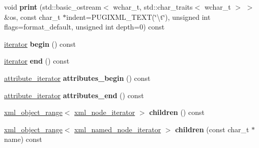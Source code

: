\begin{DoxyCompactItemize}
\item 
\hypertarget{classpugi_1_1xml__node_a59a563de9fb47e3916f35f14a77d19a9}{}void {\bfseries print} (std\+::basic\+\_\+ostream$<$ wchar\+\_\+t, std\+::char\+\_\+traits$<$ wchar\+\_\+t $>$ $>$ \&os, const char\+\_\+t $\ast$indent=P\+U\+G\+I\+X\+M\+L\+\_\+\+T\+E\+X\+T(\char`\"{}\textbackslash{}t\char`\"{}), unsigned int flags=format\+\_\+default, unsigned int depth=0) const \label{classpugi_1_1xml__node_a59a563de9fb47e3916f35f14a77d19a9}

\item 
\hypertarget{classpugi_1_1xml__node_af1cfcc7ccae47095cd781a3c9c9b06e4}{}\hyperlink{classpugi_1_1xml__node__iterator}{iterator} {\bfseries begin} () const \label{classpugi_1_1xml__node_af1cfcc7ccae47095cd781a3c9c9b06e4}

\item 
\hypertarget{classpugi_1_1xml__node_a6e5b29519d6a1f08aa936d96624e095a}{}\hyperlink{classpugi_1_1xml__node__iterator}{iterator} {\bfseries end} () const \label{classpugi_1_1xml__node_a6e5b29519d6a1f08aa936d96624e095a}

\item 
\hypertarget{classpugi_1_1xml__node_a1b4ab605d879cf5623e20505500b836e}{}\hyperlink{classpugi_1_1xml__attribute__iterator}{attribute\+\_\+iterator} {\bfseries attributes\+\_\+begin} () const \label{classpugi_1_1xml__node_a1b4ab605d879cf5623e20505500b836e}

\item 
\hypertarget{classpugi_1_1xml__node_a528b9274b0adeeda5ed12567057bee17}{}\hyperlink{classpugi_1_1xml__attribute__iterator}{attribute\+\_\+iterator} {\bfseries attributes\+\_\+end} () const \label{classpugi_1_1xml__node_a528b9274b0adeeda5ed12567057bee17}

\item 
\hypertarget{classpugi_1_1xml__node_a267ab4724e63940e5a50234fc52bc855}{}\hyperlink{classpugi_1_1xml__object__range}{xml\+\_\+object\+\_\+range}$<$ \hyperlink{classpugi_1_1xml__node__iterator}{xml\+\_\+node\+\_\+iterator} $>$ {\bfseries children} () const \label{classpugi_1_1xml__node_a267ab4724e63940e5a50234fc52bc855}

\item 
\hypertarget{classpugi_1_1xml__node_afa490049463cabe6c5b5d774d85e5569}{}\hyperlink{classpugi_1_1xml__object__range}{xml\+\_\+object\+\_\+range}$<$ \hyperlink{classpugi_1_1xml__named__node__iterator}{xml\+\_\+named\+\_\+node\+\_\+iterator} $>$ {\bfseries children} (const char\+\_\+t $\ast$name) const \label{classpugi_1_1xml__node_afa490049463cabe6c5b5d774d85e5569}


\end{DoxyCompactItemize}
